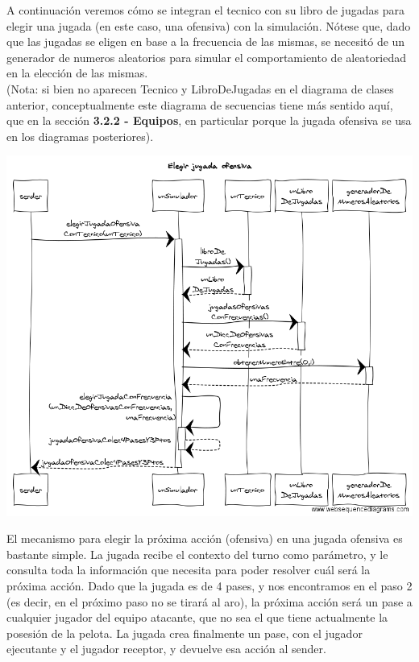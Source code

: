 A continuación veremos cómo se integran el tecnico con su libro de jugadas para elegir una jugada (en este caso, una ofensiva) con la simulación. Nótese que, dado que las jugadas se eligen en base a la frecuencia de las mismas, se necesitó de un generador de numeros aleatorios para simular el comportamiento de aleatoriedad en la elección de las mismas. \\
(Nota: si bien no aparecen Tecnico y LibroDeJugadas en el diagrama de clases anterior, conceptualmente este diagrama de secuencias tiene más sentido aquí, que en la sección \textbf{3.2.2  - Equipos}, en particular porque la jugada ofensiva se usa en los diagramas posteriores).
\begin{center}
\includegraphics[scale=0.45]{diseno/Elegir_jugada_ofensiva.png} 
\end{center}


El mecanismo para elegir la próxima acción (ofensiva) en una jugada ofensiva es bastante simple. La jugada recibe el contexto del turno como parámetro, y le consulta toda la información que necesita para poder resolver cuál será la próxima acción. Dado que la jugada es de 4 pases, y nos encontramos en el paso 2 (es decir, en el próximo paso no se tirará al aro), la próxima acción será un pase a cualquier jugador del equipo atacante, que no sea el que tiene actualmente la posesión de la pelota. La jugada crea finalmente un pase, con el jugador ejecutante y el jugador receptor, y devuelve esa acción al sender.

